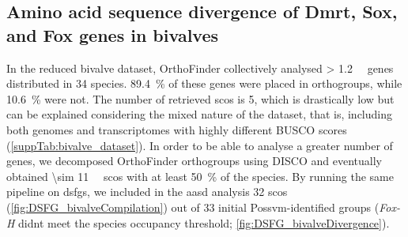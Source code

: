 \subsection{Amino acid sequence divergence of Dmrt, Sox, and Fox genes in bivalves}
In the reduced bivalve dataset, OrthoFinder collectively analysed \qty{> 1.2}{\mega\nothing} genes distributed in 34 species. \qty{89.4}{\percent} of these genes were placed in orthogroups, while \qty{10.6}{\percent} were not. The number of retrieved \glspl{sco} is 5, which is drastically low but can be explained considering the mixed nature of the dataset, that is, including both genomes and transcriptomes with highly different BUSCO scores (\cref{suppTab:bivalve_dataset}). In order to be able to analyse a greater number of genes, we decomposed OrthoFinder orthogroups using DISCO and eventually obtained \qty{\sim 11}{\kilo\nothing} \glspl{sco} with at least \qty{50}{\percent} of the species. By running the same pipeline on \glspl{dsfg}, we included in the \gls{aasd} analysis 32 \glspl{sco} (\cref{fig:DSFG_bivalveCompilation}) out of 33 initial Possvm-identified groups (\textit{Fox-H} didn\curlyapostrophe t meet the species occupancy threshold; \cref{fig:DSFG_bivalveDivergence}).

